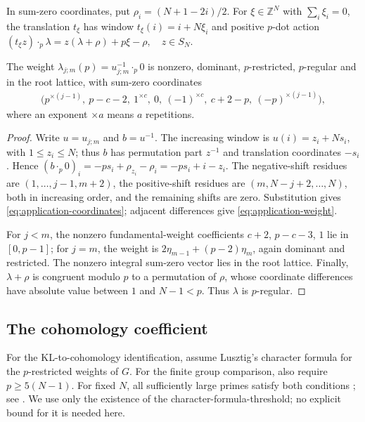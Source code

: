 \documentclass[a4paper,11pt]{amsart}
\numberwithin{equation}{subsection}
\theoremstyle{plain}
\theoremstyle{definition}
\theoremstyle{remark}
\begin{document}
In sum-zero coordinates, put $\rho_i=(N+1-2i)/2$.
For $\xi\in\mathbb Z^N$ with $\sum_i\xi_i=0$, the translation $t_\xi$ has
window $t_\xi(i)=i+N\xi_i$ and positive $p$-dot action
$(t_\xi z)\mathbin{\cdot_p}\lambda
=z(\lambda+\rho)+p\xi-\rho,\quad z\in S_N$.

\begin{lemma}\label{lem:application-weight}
The weight $\lambda_{j;m}(p)=u_{j;m}^{-1}\cdot_p0$ is nonzero,
dominant, $p$-restricted, $p$-regular and in the root lattice,
with sum-zero coordinates
\begin{gather}\label{eq:application-coordinates}
\bigl(p^{\times(j-1)},\ p-c-2,\ 1^{\times c},\ 0,\
(-1)^{\times c},\ c+2-p,\ (-p)^{\times(j-1)}\bigr),
\end{gather}
where an exponent $\times a$ means $a$ repetitions.
\end{lemma}

\begin{proof}
Write $u=u_{j;m}$ and $b=u^{-1}$. The increasing window is
$u(i)=z_i+Ns_i$, with $1\le z_i\le N$; thus $b$ has permutation
part $z^{-1}$ and translation coordinates $-s_i$. Hence
$(b\cdot_p0)_i=-ps_i+\rho_{z_i}-\rho_i=-ps_i+i-z_i$.
The negative-shift residues are $(1,\ldots,j-1,m+2)$, the
positive-shift residues are $(m,N-j+2,\ldots,N)$, both in increasing
order, and the remaining shifts are zero. Substitution gives
\autoref{eq:application-coordinates}; adjacent differences give
\autoref{eq:application-weight}.

For $j<m$, the nonzero fundamental-weight coefficients
$c+2$, $p-c-3$, $1$ lie in $[0,p-1]$; for $j=m$, the weight is
$2\eta_{m-1}+(p-2)\eta_m$, again dominant and restricted.
The nonzero integral sum-zero vector lies in the root lattice.
Finally, $\lambda+\rho$ is congruent modulo $p$ to a permutation
of $\rho$, whose coordinate differences have absolute value
between $1$ and $N-1<p$. Thus $\lambda$ is $p$-regular.
\end{proof}

\subsection{The cohomology coefficient}

For the KL-to-cohomology identification, assume Lusztig's
character formula for the $p$-restricted weights of $G$.
For the finite group comparison, also require $p\ge5(N-1)$.
For fixed $N$,
all sufficiently large primes satisfy both conditions \cite{AJS};
see \cite[Theorem~3.1]{Luebeck}.
We use only the existence of the character-formula-threshold;
no explicit bound for it is needed here.
\end{document}
